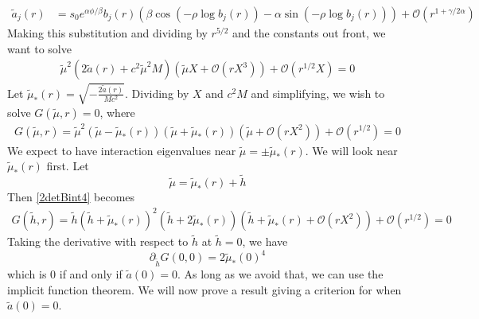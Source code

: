 \documentclass[thesis.tex]{subfiles}
\begin{document}
\begin{align}\label{tildea1}
\tilde{a}_j(r) &= s_0 e^{\alpha \phi/\beta} b_j(r) \left( \beta \cos\left(-\rho \log b_j(r) \right) - \alpha \sin \left(-\rho \log b_j(r) \right) \right) + \mathcal{O}(r^{1+\gamma/2\alpha})
\end{align}
Making this substitution and dividing by $r^{5/2}$ and the constants out front, we want to solve
\begin{equation}\label{2detBint4}
\begin{aligned}
\tilde{\mu}^2 (2\tilde{a}(r) + c^2 \tilde{\mu}^2 M)\left( \tilde{\mu} X + \mathcal{O}(r X^3)\right) + \mathcal{O}( r^{1/2} X ) = 0
\end{aligned}
\end{equation}
Let $\tilde{\mu}_*(r) = \sqrt{-\frac{2\tilde{a}(r)}{M c^2}}$. Dividing by $X$ and $c^2 M$ and simplifying, we wish to solve $G(\tilde{\mu},r) = 0$, where
\begin{equation}\label{2detBint4}
\begin{aligned}
G(\tilde{\mu},r) = \tilde{\mu}^2 (\tilde{\mu} - \tilde{\mu}_*(r))(\tilde{\mu} + \tilde{\mu}_*(r))\left( \tilde{\mu} + \mathcal{O}(r X^2)\right) + \mathcal{O}( r^{1/2} ) = 0
\end{aligned}
\end{equation}
We expect to have interaction eigenvalues near $\tilde{\mu} = \pm \tilde{\mu}_*(r)$. We will look near $\tilde{\mu}_*(r)$ first. Let
\[
\tilde{\mu} = \tilde{\mu}_*(r) + \tilde{h}
\]
Then \cref{2detBint4} becomes
\begin{equation}\label{2detBint5}
\begin{aligned}
G(\tilde{h},r) = \tilde{h} ( \tilde{h} + \tilde{\mu}_*(r))^2 (\tilde{h} + 2 \tilde{\mu}_*(r))\left(\tilde{h} + \tilde{\mu}_*(r) + \mathcal{O}(r X^2)\right) + \mathcal{O}( r^{1/2} ) = 0
\end{aligned}
\end{equation}
Taking the derivative with respect to $\tilde{h}$ at $\tilde{h} = 0$, we have
\[
\partial_{\tilde{h}} G(0, 0) = 2 \tilde{\mu}_*(0)^4 
\]
which is 0 if and only if $\tilde{a}(0) = 0$. As long as we avoid that, we can use the implicit function theorem. We will now prove a result giving a criterion for when $\tilde{a}(0) = 0$.
\end{document}

